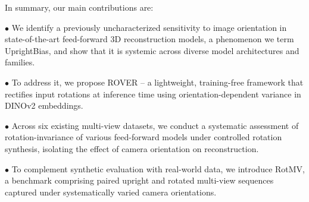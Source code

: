 In summary, our main contributions are:

$\bullet$ We identify a previously uncharacterized sensitivity to image orientation in state-of-the-art feed-forward 3D reconstruction models, a phenomenon we term UprightBias, and show that it is systemic across diverse model architectures and families.

$\bullet$ To address it, we propose ROVER -- a lightweight, training-free framework that rectifies input rotations at inference time using orientation-dependent variance in DINOv2 embeddings.


$\bullet$ Across six existing multi-view datasets, we conduct a systematic assessment of rotation-invariance of various feed-forward models under controlled rotation synthesis, isolating the effect of camera orientation on reconstruction.

$\bullet$ To complement synthetic evaluation with real-world data, we introduce RotMV, a benchmark comprising paired upright and rotated multi-view sequences captured under systematically varied camera orientations.
